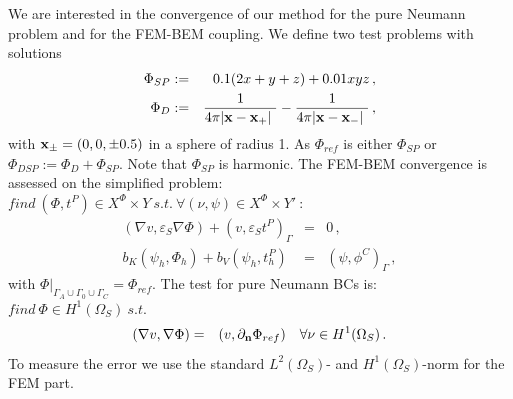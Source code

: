\documentclass[runningheads]{lncse}
\newcommand{\mydiff}[2]{{}{#2}}
\begin{document}
We are 
interested in the convergence 
of our method for the pure Neumann problem and for the FEM-BEM coupling.
%
\mydiff{To this end, we}{We} define two 
test problems with \mydiff{reference solutions}{solutions} 
\begin{eqnarray}
\label{DRS_FEM_BEM_wSciPAL-eq:sum-prod}
\Phi_{SP} & := & 0.1 (2x + y + z) + 0.01 xyz \,,  \\
%
\label{DRS_FEM_BEM_wSciPAL-eq:sum-prod-dipole}
\Phi_{D} & := &  \frac{1}{4 \pi |  {\bf x} - {\bf x}_+ | } -   \frac{1}{4 \pi |  {\bf x} - {\bf x}_- | } \,,
\end{eqnarray}
%
with $ {\bf x}_{\pm} = (0,0, \pm 0.5)$ in a sphere of radius 1.
%
As $\Phi_{ref}$ is either $\Phi_{SP} $ or $\Phi_{DSP} := \Phi_{D}  + \Phi_{SP}  $.
%
Note that $\Phi_{SP}$ is harmonic.
%
The  FEM-BEM convergence is assessed on the simplified problem: 
$find ~ (\Phi, t^P) \in X^{\Phi} \times Y ~ s.t. ~\forall  (\nu, \psi) \in X^{\Phi} \times Y' ~:$
%
\begin{subequations}
\label{DRS_FEM_BEM_wSciPAL-eq:fem-bem-testcase}
\begin{eqnarray}
 (\nabla v, \varepsilon_S \nabla \Phi)  
+
( v ,  \varepsilon_S t^P)_{\Gamma} & = &  0 \,,  \\
%
b_K(\psi_h, \Phi_h) %
    + 
     b_V(\psi_h,  t^P_h)
    & = & 
\left(\psi, \phi^C \right)_{\Gamma} \,, %
\end{eqnarray}
\end{subequations}
%
with $\Phi|_{\Gamma_A \cup \Gamma_0 \cup \Gamma_C} = \Phi_{ref} $.
%
%
The test for pure Neumann BCs is: $find ~ \Phi \in H^1(\Omega_S) ~s.t.$
%
\begin{eqnarray}
\label{DRS_FEM_BEM_wSciPAL-eq:pvN-testcase}
 (\nabla v, \nabla \Phi)  
 & = & 
( v ,  \partial_{\bf n}\Phi_{ref}  ) \quad \forall \nu \in  H^1(\Omega_S)  \,.
\end{eqnarray}
%
%
To measure the error we use the standard $L^2(\Omega_S)$- and $H^1(\Omega_S)$-norm
for the FEM part. 
\end{document}
